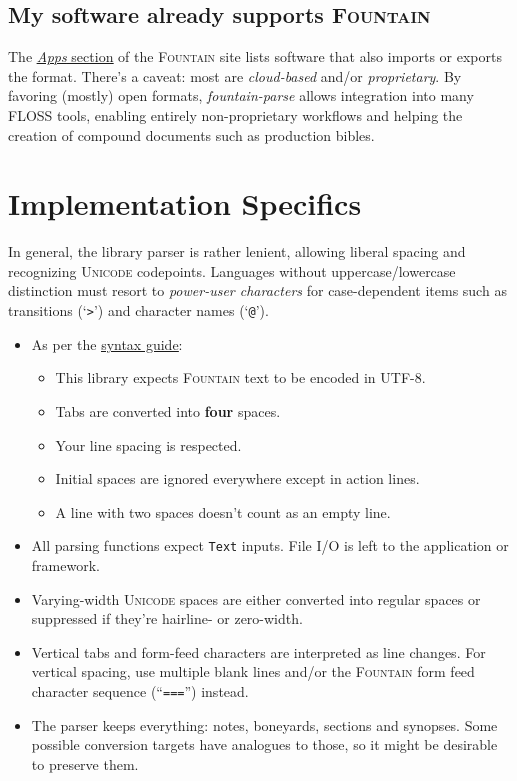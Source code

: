 \documentclass[11pt]{article}
\newcommand{\link}[2]{\underline{\color{darkblue}\href{#1}{#2}}}
\begin{document}
\subsection*{My software already supports \textsc{Fountain}}
The \link{https://fountain.io/apps/}{\emph{Apps} section} of the
\textsc{Fountain} site lists software that also imports or exports the
format. There's a caveat: most are \emph{cloud-based} and/or
\emph{proprietary}. By favoring (mostly) open formats,
\emph{fountain-parse} allows integration into many \textsc{FLOSS} tools,
enabling entirely non-proprietary workflows and helping the creation of
compound documents such as production bibles.

\section*{Implementation Specifics}
In general, the library parser is rather lenient, allowing liberal
spacing and recognizing \textsc{Unicode} codepoints. Languages without
uppercase/lowercase distinction must resort to \emph{power-user
characters} for case-dependent items such as transitions (`\texttt{>}')
and character names (`\texttt{@}').
  \begin{itemize}
    \item As per the \link{https://fountain.io/syntax/}{syntax guide}:
      \begin{itemize}
        \item This library expects \textsc{Fountain} text to be encoded
          in \textsc{UTF-8}\@.
        \item Tabs are converted into \textbf{four} spaces.
        \item Your line spacing is respected.
        \item Initial spaces are ignored everywhere except in action
          lines.
        \item A line with two spaces doesn't count as an empty line.
      \end{itemize}
    \item All parsing functions expect \texttt{Text} inputs.  File I/O
      is left to the application or framework.
    \item Varying-width \textsc{Unicode} spaces are either converted
      into regular spaces or suppressed if they're hairline- or
      zero-width.
    \item Vertical tabs and form-feed characters are interpreted as line
      changes. For vertical spacing, use multiple blank lines and/or the
      \textsc{Fountain} form feed character sequence (``\texttt{===}'')
      instead.
    \item The parser keeps everything: notes, boneyards, sections and
      synopses. Some possible conversion targets have analogues to
      those, so it might be desirable to preserve them.
  \end{itemize}
\end{document}
